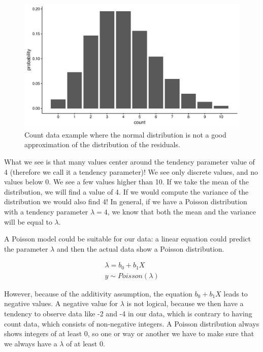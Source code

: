 \documentclass[]{book}\usepackage[]{graphicx}\usepackage[]{color}
\makeatletter
\def\maxwidth{ %
  \ifdim\Gin@nat@width>\linewidth
    \linewidth
  \else
    \Gin@nat@width
  \fi
}
\newenvironment{knitrout}{}{} %
\makeatother
\begin{document}
\begin{knitrout}
\color{fgcolor}\begin{figure}

{\centering \includegraphics[width=\maxwidth]{figure/gen_15-1} 

}

\caption[Count data example where the normal distribution is not a good approximation of the distribution of the residuals]{Count data example where the normal distribution is not a good approximation of the distribution of the residuals.}\label{fig:gen_15}
\end{figure}


\end{knitrout}

What we see is that many values center around the tendency parameter value of 4 (therefore we call it a tendency parameter)! We see only discrete values, and no values below 0. We see a few values higher than 10. If we take the mean of the distribution, we will find a value of 4. If we would compute the variance of the distribution we would also find 4! In general, if we have a Poisson distribution with a tendency parameter $\lambda=4$, we know that both the mean and the variance will be equal to $\lambda$.

A Poisson model could be suitable for our data: a linear equation could predict the parameter $\lambda$ and then the actual data show a Poisson distribution.


\begin{eqnarray}
\lambda = b_0 + b_1 X \\
y \sim Poisson(\lambda)
\end{eqnarray}

However, because of the additivity assumption, the equation $b_0 + b_1 X$ leads to negative values. A negative value for $\lambda$ is not logical, because we then have a tendency to observe data like -2 and -4 in our data, which is contrary to having count data, which consists of non-negative integers. A Poisson distribution always shows integers of at least 0, so one or way or another we have to make sure that we always have a $\lambda$ of at least 0.
\end{document}
